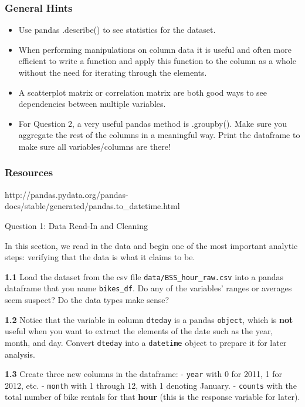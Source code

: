 \documentclass[11pt]{article}
\providecommand{\tightlist}{%
      \setlength{\itemsep}{0pt}\setlength{\parskip}{0pt}}
\begin{document}
    \subsubsection{General Hints}\label{general-hints}

\begin{itemize}
\tightlist
\item
  Use pandas .describe() to see statistics for the dataset.
\item
  When performing manipulations on column data it is useful and often
  more efficient to write a function and apply this function to the
  column as a whole without the need for iterating through the elements.
\item
  A scatterplot matrix or correlation matrix are both good ways to see
  dependencies between multiple variables.
\item
  For Question 2, a very useful pandas method is .groupby(). Make sure
  you aggregate the rest of the columns in a meaningful way. Print the
  dataframe to make sure all variables/columns are there!
\end{itemize}

\subsubsection{Resources}\label{resources}

http://pandas.pydata.org/pandas-docs/stable/generated/pandas.to\_datetime.html

     Question 1: Data Read-In and Cleaning

In this section, we read in the data and begin one of the most important
analytic steps: verifying that the data is what it claims to be.

\textbf{1.1} Load the dataset from the csv file
\texttt{data/BSS\_hour\_raw.csv} into a pandas dataframe that you name
\texttt{bikes\_df}. Do any of the variables' ranges or averages seem
suspect? Do the data types make sense?

\textbf{1.2} Notice that the variable in column \texttt{dteday} is a
pandas \texttt{object}, which is \textbf{not} useful when you want to
extract the elements of the date such as the year, month, and day.
Convert \texttt{dteday} into a \texttt{datetime} object to prepare it
for later analysis.

\textbf{1.3} Create three new columns in the dataframe: - \texttt{year}
with 0 for 2011, 1 for 2012, etc. - \texttt{month} with 1 through 12,
with 1 denoting January. - \texttt{counts} with the total number of bike
rentals for that \textbf{hour} (this is the response variable for
later).
\end{document}
